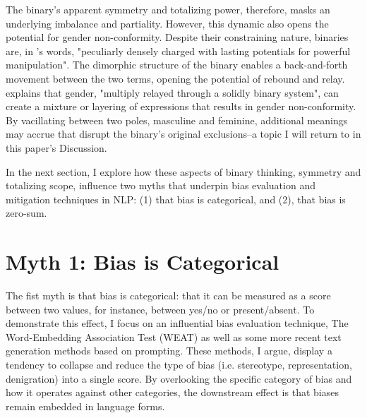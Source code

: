\documentclass[11pt]{article}
\begin{document}
The binary's apparent symmetry and totalizing power, therefore, masks
an underlying imbalance and partiality. However, this dynamic also opens the potential for gender non-conformity.
Despite their constraining nature, binaries are, in \citet{sedgwick:1990}'s words,
"peculiarly densely charged with lasting potentials for
powerful manipulation". The dimorphic structure of the binary enables
a back-and-forth movement between the two terms, opening the potential
of rebound and relay. \citet{halberstam:1998} explains that gender,
"multiply relayed through a solidly binary system", can create a mixture or layering
of expressions that results in gender non-conformity. By vacillating
between two poles, masculine and feminine, additional meanings may
accrue that disrupt the binary's original exclusions--a topic I will
return to in this paper's Discussion.

In the next section, I explore how these aspects of binary thinking,
symmetry and totalizing scope, influence two myths that
underpin bias evaluation and mitigation techniques in NLP: (1) that
bias is categorical, and (2), that bias is zero-sum.

\section{Myth 1: Bias is Categorical}

The fist myth is that bias is categorical: that it can be measured as a score between two values, for instance, between yes/no or
present/absent. To demonstrate this effect, I focus on an influential
bias evaluation technique, The Word-Embedding Association Test (WEAT)
\citep{caliskan:2017} as well as some more recent text generation methods
based on prompting. These methods, I argue, display a tendency to collapse and reduce the
type of bias (i.e. stereotype, representation, denigration) into a
single score. By overlooking the specific category of bias and how it
operates against other categories, the downstream effect is that biases
remain embedded in language forms.
\end{document}
